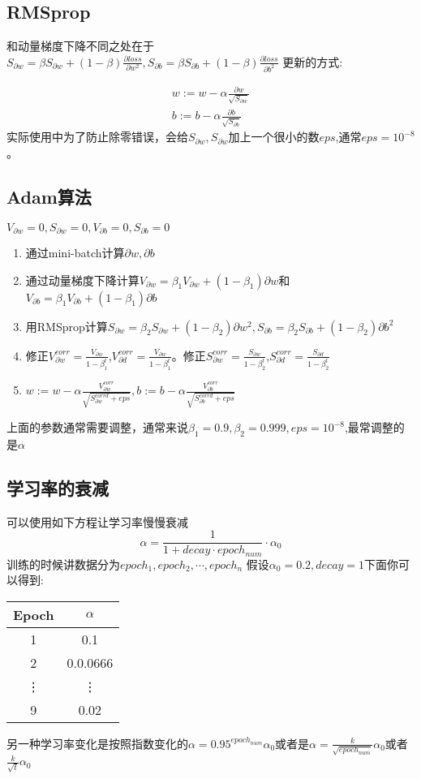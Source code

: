 \subsection{RMSprop}
和动量梯度下降不同之处在于
$S_{\partial w} = \beta S_{\partial w}+(1-\beta)\frac{\partial loss}{\partial w^2},S_{\partial b} = \beta S_{\partial b}+(1-\beta)\frac{\partial loss}{\partial b^2}$
更新的方式:


\begin{align} 
w:=w-\alpha\frac{\partial w}{\sqrt{S_{\partial w}}}\\
b:=b-\alpha\frac{\partial b}{\sqrt{S_{\partial b}}}
\end{align}
实际使用中为了防止除零错误，会给$S_{\partial w},S_{\partial w}$加上一个很小的数$eps$,通常$eps=10^{-8}$。
\subsection{Adam算法}
$V_{\partial w}=0,S_{\partial w}=0,V_{\partial b}=0,S_{\partial b}=0$
\begin{enumerate}
\item 通过mini-batch计算$\partial w,\partial b$
\item 通过动量梯度下降计算$V_{\partial w}=\beta_1V_{\partial w}+(1-\beta_1)\partial w$和$V_{\partial b}=\beta_1V_{\partial b}+(1-\beta_1)\partial b$
\item 用RMSprop计算$S_{\partial w}=\beta_2S_{\partial w}+(1-\beta_2)\partial w^2,S_{\partial b}=\beta_2S_{\partial b}+(1-\beta_2)\partial b^2$
\item 修正$V_{\partial w}^{corr}=\frac{V_{\partial w}}{1-\beta_1^t}$,$V_{\partial d}^{corr}=\frac{V_{\partial w}}{1-\beta_1^t}$。修正$S_{\partial w}^{corr}=\frac{S_{\partial w}}{1-\beta_2^t}$,$S_{\partial d}^{corr}=\frac{S_{\partial d}}{1-\beta_2^t}$
\item $w:=w-\alpha\frac{V_{\partial w}^{corr}}{\sqrt{S_{\partial w}^{corrd}+eps}},b:=b-\alpha\frac{V_{\partial b}^{corr}}{\sqrt{S_{\partial b}^{corrd}+eps}}$
\end{enumerate}
上面的参数通常需要调整，通常来说$\beta_1=0.9,\beta_2=0.999,eps=10^{-8}$,最常调整的是$\alpha$
\subsection{学习率的衰减}
可以使用如下方程让学习率慢慢衰减
\[\alpha = \frac{1}{1+decay\cdot epoch_{num}}\cdot \alpha_0\]
训练的时候讲数据分为$epoch_1,epoch_2,\cdots,epoch_n$
假设$\alpha_0=0.2,decay=1$下面你可以得到:
\begin{table*}
\centering
\begin{tabular}{|c|c|}
\hline
Epoch&$\alpha$\\
\hline
1&0.1\\
\hline
2&0.0.0666\\
\hline
\vdots&\vdots\\
\hline
9&0.02\\
\hline
\end{tabular}
\end{table*}
另一种学习率变化是按照指数变化的$\alpha=0.95^{epoch_{num}}\alpha_0$或者是$\alpha=\frac{k}{\sqrt{epoch_{num}}}\alpha_0$或者$\frac{k}{\sqrt{t}}\alpha_0$
